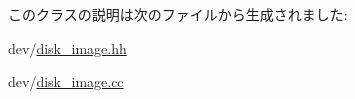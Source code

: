 このクラスの説明は次のファイルから生成されました:\begin{DoxyCompactItemize}
\item 
dev/\hyperlink{disk__image_8hh}{disk\_\-image.hh}\item 
dev/\hyperlink{disk__image_8cc}{disk\_\-image.cc}\end{DoxyCompactItemize}
